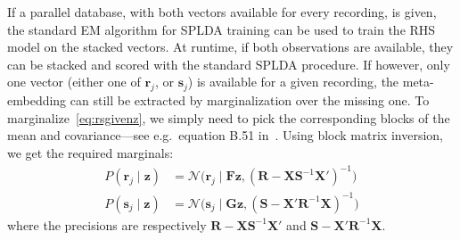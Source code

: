\documentclass[a4paper,oneside,12pt,english]{report}
\def\zvec{\mathbf{z}}
\def\ND{\mathcal{N}}
\def\Fmat{\mathbf{F}}
\def\Gmat{\mathbf{G}}
\def\Smat{\mathbf{S}}
\def\Xmat{\mathbf{X}}
\def\Rmat{\mathbf{R}}
\def\Gmat{\mathbf{G}}
\def\svec{\mathbf{s}}
\def\rvec{\mathbf{r}}
\begin{document}
If a parallel database, with both vectors available for every recording, is given, the standard EM algorithm for SPLDA training can be used to train the RHS model on the stacked vectors. At runtime, if both observations are available, they can be stacked and scored with the standard SPLDA procedure. If however, only one vector (either one of $\rvec_j$, or $\svec_j$) is available for a given recording, the meta-embedding can still be extracted by marginalization over the missing one. To marginalize~\eqref{eq:rsgivenz}, we simply need to pick the corresponding blocks of the mean and covariance---see e.g.\ equation B.51 in~\cite{PRML}. Using block matrix inversion, we get the required marginals:
\begin{align}
P(\rvec_j\mid\zvec) &= \ND\bigl(\rvec_j\mid\Fmat\zvec,(\Rmat-\Xmat\Smat^{-1}\Xmat')^{-1}\bigr)\\
P(\svec_j\mid\zvec) &= \ND\bigl(\svec_j\mid\Gmat\zvec,(\Smat-\Xmat'\Rmat^{-1}\Xmat)^{-1}\bigr)
\end{align}
where the precisions are respectively $\Rmat-\Xmat\Smat^{-1}\Xmat'$ and $\Smat-\Xmat'\Rmat^{-1}\Xmat$.   
\end{document}
